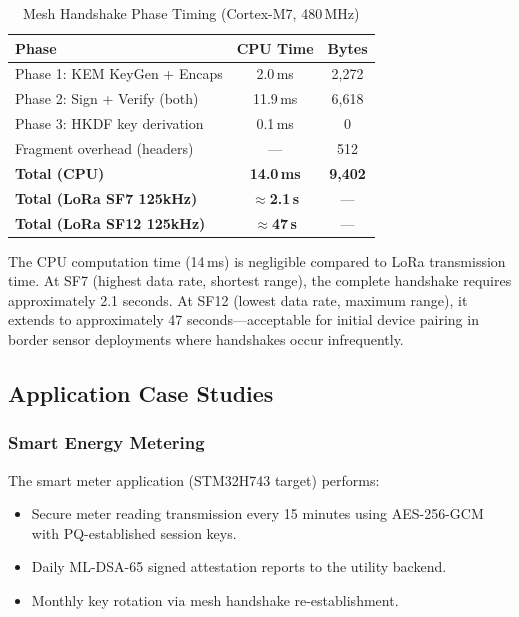 \documentclass[conference,10pt]{IEEEtran}
\begin{document}
\begin{table}[t]
\centering
\caption{Mesh Handshake Phase Timing (Cortex-M7, 480\,MHz)}
\label{tab:handshake}
\begin{tabular}{lcc}
\toprule
\textbf{Phase} & \textbf{CPU Time} & \textbf{Bytes} \\
\midrule
Phase 1: KEM KeyGen + Encaps & 2.0\,ms & 2,272 \\
Phase 2: Sign + Verify (both) & 11.9\,ms & 6,618 \\
Phase 3: HKDF key derivation & 0.1\,ms & 0 \\
Fragment overhead (headers) & --- & 512 \\
\midrule
\textbf{Total (CPU)} & \textbf{14.0\,ms} & \textbf{9,402} \\
\textbf{Total (LoRa SF7 125kHz)} & \textbf{$\approx$2.1\,s} & --- \\
\textbf{Total (LoRa SF12 125kHz)} & \textbf{$\approx$47\,s} & --- \\
\bottomrule
\end{tabular}
\end{table}

The CPU computation time (14\,ms) is negligible compared to LoRa transmission time. At SF7 (highest data rate, shortest range), the complete handshake requires approximately 2.1 seconds. At SF12 (lowest data rate, maximum range), it extends to approximately 47 seconds---acceptable for initial device pairing in border sensor deployments where handshakes occur infrequently.

\subsection{Application Case Studies}

\subsubsection{Smart Energy Metering}

The smart meter application (STM32H743 target) performs:
\begin{itemize}[leftmargin=*]
  \item Secure meter reading transmission every 15 minutes using AES-256-GCM with PQ-established session keys.
  \item Daily ML-DSA-65 signed attestation reports to the utility backend.
  \item Monthly key rotation via mesh handshake re-establishment.
\end{itemize}
\end{document}
